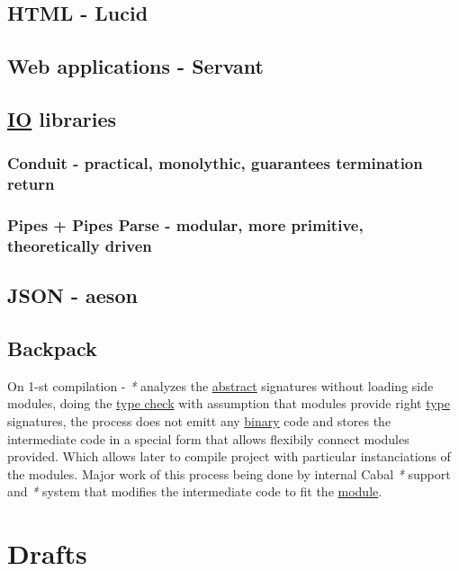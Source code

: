 \documentclass[a4paper,14pt,oneside]{book}
\begin{document}
\chapter{HTML - Lucid}
\label{sec:org6c03084}

\chapter{Web applications - Servant}
\label{sec:org5aeb608}

\chapter{\hyperref[org786f026]{IO} libraries}
\label{sec:orgcd2e377}

\section{Conduit - practical, monolythic, guarantees termination return}
\label{sec:org2745ccc}

\section{Pipes + Pipes Parse - modular, more primitive, theoretically driven}
\label{sec:orgfbfac6e}

\chapter{JSON - aeson}
\label{sec:org2393f7a}

\chapter{\label{org0966f38}Backpack}
\label{sec:orga5742c9}
On 1-st compilation - \emph{*} analyzes the \hyperref[orgb942bc6]{abstract} signatures without loading side modules, doing the \hyperref[orgeec290e]{type check} with assumption that modules provide right \hyperref[orgdbcea73]{type} signatures, the process does not emitt any \hyperref[orgd4bd390]{binary} code and stores the intermediate code in a special form that allows flexibily connect modules provided. Which allows later to compile project with particular instanciations of the modules. Major work of this process being done by internal Cabal \emph{*} support and \emph{*} system that modifies the intermediate code to fit the \hyperref[org36584be]{module}.\\

\part{Drafts}
\label{sec:org7a1ce13}
\end{document}
